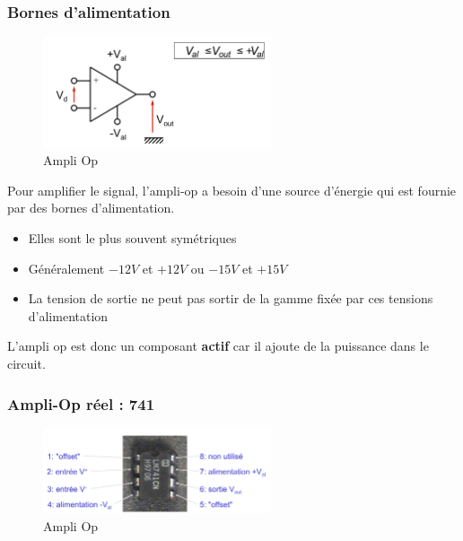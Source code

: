 \documentclass[a4paper]{article}
\begin{document}
        \subsubsection{Bornes d'alimentation}
            \begin{figure}[H]
                \begin{center}
                    \includegraphics[width=0.6\textwidth]{fig/4_ampliop_alim.png}
                    \caption{Ampli Op}
                \end{center}
            \end{figure}
            Pour amplifier le signal, l'ampli-op a besoin d'une source d'énergie qui est fournie par des bornes d'alimentation.\\
            \begin{itemize}
                \item Elles sont le plus souvent symétriques
                \item Généralement $-12V$ et $+12V$ ou $-15V$ et $+15V$
                \item La tension de sortie ne peut pas sortir de la gamme fixée par ces tensions d'alimentation
            \end{itemize}
            L'ampli op est donc un composant \textbf{actif} car il ajoute de la puissance dans le circuit.
        \subsubsection{Ampli-Op réel : 741}
            \begin{figure}[H]
                \begin{center}
                    \includegraphics[width=0.6\textwidth]{fig/4_ampliop_reel.png}
                    \caption{Ampli Op}
                \end{center}
            \end{figure}
\end{document}
